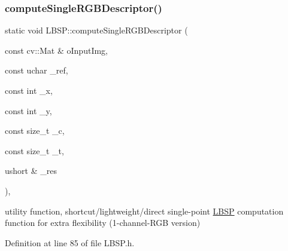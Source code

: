 \subsubsection{\texorpdfstring{compute\+Single\+R\+G\+B\+Descriptor()}{computeSingleRGBDescriptor()}}
{\footnotesize\ttfamily static void L\+B\+S\+P\+::compute\+Single\+R\+G\+B\+Descriptor (\begin{DoxyParamCaption}\item[{const cv\+::\+Mat \&}]{o\+Input\+Img,  }\item[{const uchar}]{\+\_\+ref,  }\item[{const int}]{\+\_\+x,  }\item[{const int}]{\+\_\+y,  }\item[{const size\+\_\+t}]{\+\_\+c,  }\item[{const size\+\_\+t}]{\+\_\+t,  }\item[{ushort \&}]{\+\_\+res }\end{DoxyParamCaption})\hspace{0.3cm}{\ttfamily [inline]}, {\ttfamily [static]}}



utility function, shortcut/lightweight/direct single-\/point \mbox{\hyperlink{class_l_b_s_p}{L\+B\+SP}} computation function for extra flexibility (1-\/channel-\/\+R\+GB version) 



Definition at line 85 of file L\+B\+S\+P.\+h.


